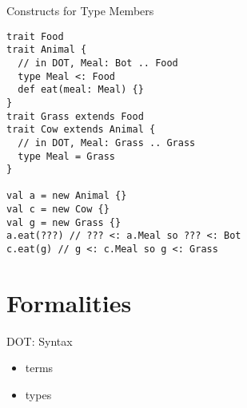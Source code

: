 \documentclass{beamer}
\begin{document}
\begin{frame}[fragile]{Constructs for Type Members}
\begin{verbatim}
trait Food
trait Animal {
  // in DOT, Meal: Bot .. Food
  type Meal <: Food
  def eat(meal: Meal) {}
}
trait Grass extends Food
trait Cow extends Animal {
  // in DOT, Meal: Grass .. Grass
  type Meal = Grass
}

val a = new Animal {}
val c = new Cow {}
val g = new Grass {}
a.eat(???) // ??? <: a.Meal so ??? <: Bot
c.eat(g) // g <: c.Meal so g <: Grass
\end{verbatim}
\end{frame}

\section{Formalities}

\begin{frame}[fragile]{DOT: Syntax}
\begin{itemize}
\item terms
\item types
\end{itemize}
\end{frame}
\end{document}
